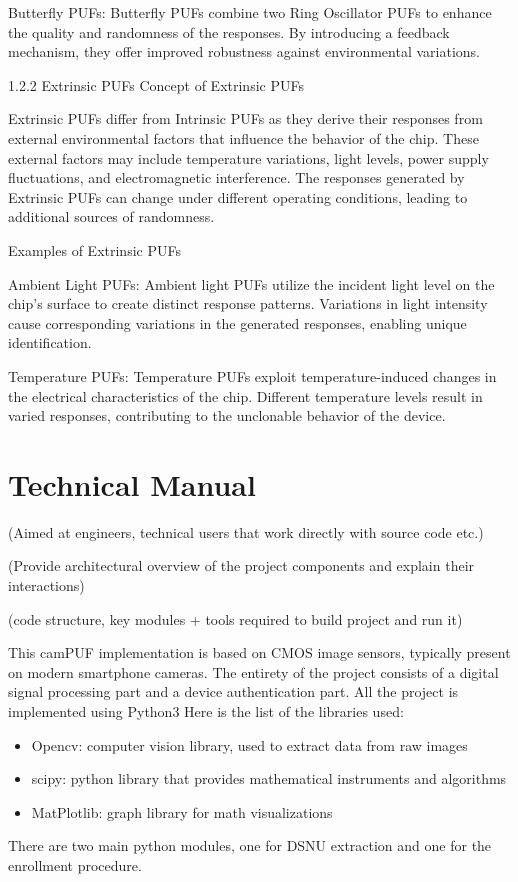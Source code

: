 \documentclass{article}
\begin{document}
Butterfly PUFs: Butterfly PUFs combine two Ring Oscillator PUFs to enhance the quality and randomness of the responses. By introducing a feedback mechanism, they offer improved robustness against environmental variations.


1.2.2 Extrinsic PUFs
Concept of Extrinsic PUFs

Extrinsic PUFs differ from Intrinsic PUFs as they derive their responses from external environmental factors that influence the behavior of the chip. These external factors may include temperature variations, light levels, power supply fluctuations, and electromagnetic interference. The responses generated by Extrinsic PUFs can change under different operating conditions, leading to additional sources of randomness.

Examples of Extrinsic PUFs

Ambient Light PUFs: Ambient light PUFs utilize the incident light level on the chip's surface to create distinct response patterns. Variations in light intensity cause corresponding variations in the generated responses, enabling unique identification.

Temperature PUFs: Temperature PUFs exploit temperature-induced changes in the electrical characteristics of the chip. Different temperature levels result in varied responses, contributing to the unclonable behavior of the device.
\section{\textbf{Technical Manual}}
(Aimed at engineers, technical users that work directly with source code etc.)

(Provide architectural overview of the project components and explain their interactions)

(code structure, key modules + tools required to build project and run it)

This camPUF implementation is based on CMOS image sensors, typically present on modern smartphone cameras.
The entirety of the project consists of a digital signal processing part and a device authentication part.
All the project is implemented using Python3
Here is the list of the libraries used:

\begin{itemize}
\item Opencv: computer vision library, used to extract data from raw images 
\item scipy: python library that provides mathematical instruments and algorithms
\item MatPlotlib: graph library for math visualizations
\end{itemize}

There are two main python modules, one for DSNU extraction and one for the enrollment procedure.
\end{document}

